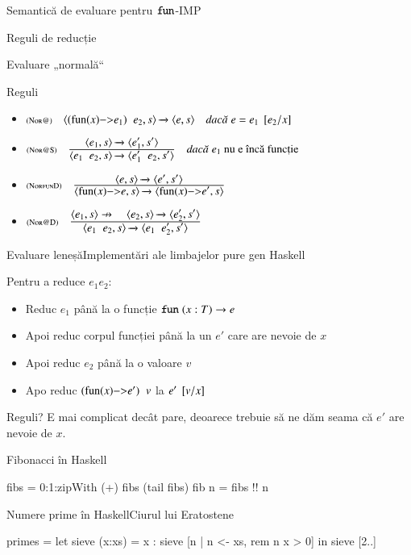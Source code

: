 \documentclass[xcolor=pdftex,romanian,colorlinks]{beamer}
\begin{document}
\begin{section}{Semantică de evaluare pentru $\mathrel{\text{\ttfamily fun}}$-IMP}
\begin{subsection}{Reguli de reducție}
\begin{frame}{Evaluare „normală“}
\begin{block}{Reguli}
\begin{itemize}
\item[]$\reg[Nor@]{\Ss{\c{(\fun{x}{e_1})\mathrel{}e_2,s}}{\c{e,s}}}{}{e = \substapp{e_1}{\subst{\substpair{e_2}{x}}}}$
\item[]$\reg[Nor@S]{\Ss{\c{e_1\mathrel{}e_2,s}}{\c{e_1'\mathrel{}e_2,s'}}}{\Ss{\c{e_1,s}}{\c{e_1',s'}}}{e_1 \mbox{ nu e încă funcție}}$
\item[]$\reg[NorfunD]{\Ss{\c{\fun{x}{e},s}}{\c{\fun{x}{e'},s}}}{\Ss{\c{e,s}}{\c{e',s'}}}{}$
\item[]$\reg[Nor@D]{\Ss{\c{e_1\mathrel{}e_2,s}}{\c{e_1\mathrel{}e_2',s'}}}{\displaystyle \c{e_1,s}\not\rightarrow \si \Ss{\c{e_2,s}}{\c{e_2',s'}}}{}$
\end{itemize}
\end{block}
\end{frame}


\begin{frame}{Evaluare leneșă}{Implementări ale limbajelor pure gen Haskell}
\begin{block}{}
Pentru a reduce $e_1 \mathrel{} e_2$:
\begin{itemize}
\item  Reduc $e_1$ până la o funcție
$\mathrel{\text{\ttfamily fun}} (x : T) \rightarrow e$
\item Apoi reduc corpul funcției  până la un $e'$ care are nevoie de $x$
\item Apoi reduc $e_2$ până la o valoare $v$
\item Apo reduc $(\fun{x}{e'})\mathrel{} v$ la $e'\mathbin{}[v/x]$
\end{itemize}
\end{block}
\begin{block}{Reguli?}
E mai complicat decât pare, deoarece trebuie să ne dăm seama că $e'$ are nevoie de $x$.
\end{block}

\end{frame}

\begin{frame}[fragile]{Fibonacci în Haskell}
\begin{asciimaude}
fibs = 0:1:zipWith (+) fibs (tail fibs)
fib n = fibs !! n
\end{asciimaude}
\end{frame}

\begin{frame}[fragile]{Numere prime în Haskell}{Ciurul lui Eratostene}
\begin{asciimaude}
primes = let { sieve (x:xs) = x : sieve [n | n <- xs, rem n x > 0] } 
           in sieve [2..] 
\end{asciimaude}
\end{frame}

\end{subsection}
%
%
\end{section}
\end{document}
